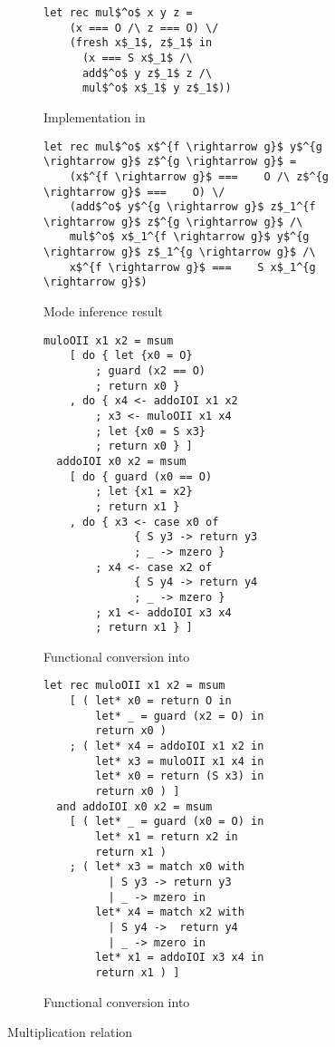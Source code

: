 \begin{figure*}[t!]
  \centering
  \begin{subfigure}[b]{0.45\textwidth}
    \begin{lstlisting}[frame=tb]
  let rec mul$^o$ x y z =
    (x === O /\ z === O) \/
    (fresh x$_1$, z$_1$ in
      (x === S x$_1$ /\
      add$^o$ y z$_1$ z /\
      mul$^o$ x$_1$ y z$_1$))
    \end{lstlisting}
    \caption{Implementation in \mk}
    \label{fig:mult_mk}
  \end{subfigure}
  \hfill
  \begin{subfigure}[b]{0.45\textwidth}
    \begin{lstlisting}[frame=tb]
  let rec mul$^o$ x$^{f \rightarrow g}$ y$^{g \rightarrow g}$ z$^{g \rightarrow g}$ =
    (x$^{f \rightarrow g}$ ===    O /\ z$^{g \rightarrow g}$ ===    O) \/
    (add$^o$ y$^{g \rightarrow g}$ z$_1^{f \rightarrow g}$ z$^{g \rightarrow g}$ /\
    mul$^o$ x$_1^{f \rightarrow g}$ y$^{g \rightarrow g}$ z$_1^{g \rightarrow g}$ /\
    x$^{f \rightarrow g}$ ===    S x$_1^{g \rightarrow g}$)
    \end{lstlisting}
    \caption{Mode inference result}
    \label{fig:mult_modded}
  \end{subfigure}

  \hfill

  \begin{subfigure}[b]{0.45\textwidth}
    \begin{lstlisting}[frame=tb]
  muloOII x1 x2 = msum
    [ do { let {x0 = O}
        ; guard (x2 == O)
        ; return x0 }
    , do { x4 <- addoIOI x1 x2
        ; x3 <- muloOII x1 x4
        ; let {x0 = S x3}
        ; return x0 } ]
  addoIOI x0 x2 = msum
    [ do { guard (x0 == O)
        ; let {x1 = x2}
        ; return x1 }
    , do { x3 <- case x0 of
              { S y3 -> return y3
              ; _ -> mzero }
        ; x4 <- case x2 of
              { S y4 -> return y4
              ; _ -> mzero }
        ; x1 <- addoIOI x3 x4
        ; return x1 } ]
    \end{lstlisting}
    \caption{Functional conversion into \haskell}
    \label{fig:mult_haskell}
  \end{subfigure}
  \hfill
  \begin{subfigure}[b]{0.45\textwidth}
    \begin{lstlisting}[frame=tb]
  let rec muloOII x1 x2 = msum
    [ ( let* x0 = return O in
        let* _ = guard (x2 = O) in
        return x0 )
    ; ( let* x4 = addoIOI x1 x2 in
        let* x3 = muloOII x1 x4 in
        let* x0 = return (S x3) in
        return x0 ) ]
  and addoIOI x0 x2 = msum
    [ ( let* _ = guard (x0 = O) in
        let* x1 = return x2 in
        return x1 )
    ; ( let* x3 = match x0 with
          | S y3 -> return y3
          | _ -> mzero in
        let* x4 = match x2 with
          | S y4 ->  return y4
          | _ -> mzero in
        let* x1 = addoIOI x3 x4 in
        return x1 ) ]
    \end{lstlisting}
    \caption{Functional conversion into \ocaml}
    \label{fig:mult_ocaml}
  \end{subfigure}

  \caption{Multiplication relation}
  \label{fig:mult}
\end{figure*}
